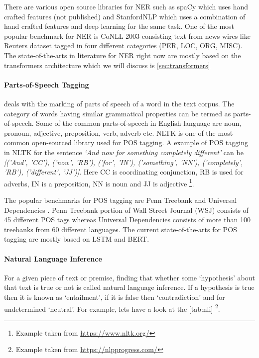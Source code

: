 There are various open source libraries for NER such as spaCy which uses hand crafted features (not published) and StanfordNLP which uses a combination of hand crafted features and deep learning for the same task. One of the most popular benchmark for NER is CoNLL 2003 \cite{sang2003introduction} consisting text from news wires like Reuters dataset tagged in four different categories (PER, LOC, ORG, MISC). The state-of-the-arts in literature for NER right now are mostly based on the transformers architecture which we will discuss is \cref{sec:transformers}


\paragraph{Parts-of-Speech Tagging}
deals with the marking of parts of speech of a word in the text corpus. The category of words having similar grammatical properties can be termed as parts-of-speech. Some of the common parts-of-speech in English language are noun, pronoun, adjective, preposition, verb, adverb etc. NLTK is one of the most common open-sourced library used for POS tagging. A example of POS tagging in NLTK for the sentence \textit{`And now for something completely different'} can be \textit{[('And', 'CC'), ('now', 'RB'), ('for', 'IN'), ('something', 'NN'),
('completely', 'RB'), ('different', 'JJ')]}. Here CC is coordinating conjunction, RB is used for adverbs, IN is a preposition, NN is noun and JJ is adjective \footnote{Example taken from \url{https://www.nltk.org/}}.

The popular benchmarks for POS tagging are Penn Treebank \cite{marcus1993building} and Universal Dependencies \cite{silveira14gold}. Penn Treebank portion of Wall Street Journal (WSJ) consists of 45 different POS tags whereas Universal Dependencies consists of more than 100 treebanks from 60 different languages. The current state-of-the-arts for POS tagging are mostly based on LSTM and BERT.

\paragraph{Natural Language Inference}
For a given piece of text or premise, finding that whether some `hypothesis' about that text is true or not is called natural language inference. If a hypothesis is true then it is known as `entailment', if it is false then `contradiction' and for undetermined `neutral'. For example, lets have a look at the \cref{tab:nli} \footnote{Example taken from \url{https://nlpprogress.com/}}.

